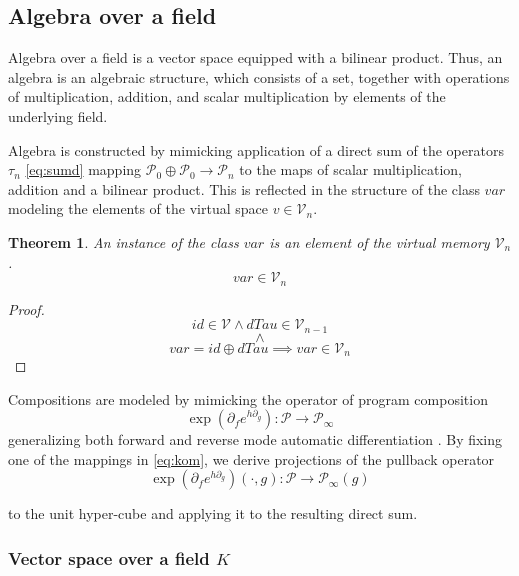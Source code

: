 \documentclass{article}
\newcommand{\VV}{\mathcal{V}}
\newcommand{\dP}{\mathcal{P}}
\newcommand{\D}{\partial}
\newcommand{\sumd}{\tau}
\newtheorem{izrek}{Theorem}[section]
\begin{document}
\subsection{Algebra over a field}\label{sec:Algebra}

 Algebra over a field is a vector space equipped with a bilinear product. Thus, an algebra is an algebraic structure, which consists of a set, together with operations of multiplication, addition, and scalar multiplication by elements of the underlying field. \cite[p.~3]{Algebra}
 
 Algebra is constructed by mimicking application of a direct sum of the operators $\sumd_n$ \eqref{eq:sumd} mapping $\dP_0\oplus\dP_0\to\dP_n$ to the maps of scalar multiplication, addition and a bilinear product. This is reflected in the structure of the class $var$  modeling the elements of the virtual space $v\in\VV_n$. 
 
 \begin{izrek}
 An instance of the class $var$ is an element of the virtual memory $\VV_n$.
  \begin{equation}
  var\in\VV_n
  \end{equation}
 \end{izrek}
 \begin{proof}
 \begin{equation}
  id\in \VV\land  dTau\in \VV_{n-1}
  \end{equation}
  $$\land$$
  \begin{equation}
  var=id\oplus dTau\implies var\in\VV_n
  \end{equation}
 \end{proof}
 
 Compositions are modeled by mimicking the operator of program composition \cite[Theorem~21]{OperationalCalculus}
 \begin{equation}\label{eq:kom}
   \exp(\D_fe^{h\D_g}): \dP\to\dP_\infty
   \end{equation}
 generalizing both forward and reverse mode automatic differentiation \cite[Remark~22]{OperationalCalculus}. By fixing one of the mappings in \eqref{eq:kom}, we derive projections of the pullback operator
 \begin{equation}\label{eq:komp}
    \exp(\D_fe^{h\D_g})(\cdot,g): \dP\to\dP_\infty(g)
    \end{equation}

  to the unit hyper-cube and applying it to the resulting direct sum.

\subsubsection{Vector space over a field $K$}\label{sec:vectorSpace}
 
\end{document}
